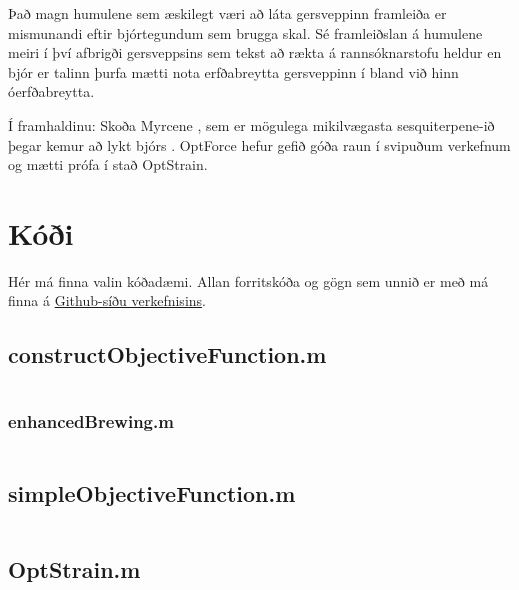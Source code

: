 \documentclass[11pt]{article}
\newcommand{\matlab}[1]{\inputminted[linenos, frame=lines, label=#1, fontsize=\small]{matlab}{#1}}
\begin{document}
\begin{multicols}{2}
Það magn humulene sem æskilegt væri að láta gersveppinn framleiða er mismunandi eftir bjórtegundum sem brugga skal. Sé framleiðslan á humulene meiri í því afbrigði gersveppsins sem tekst að rækta á rannsóknarstofu heldur en bjór er talinn þurfa mætti nota erfðabreytta gersveppinn í bland við hinn óerfðabreytta.

Í framhaldinu: Skoða Myrcene \cite[KEGG: C06074]{Kanehisa01012000}, sem er mögulega mikilvægasta sesquiterpene-ið þegar kemur að lykt bjórs \cite{guadagni1966odour}. OptForce\cite{ranganathan2010optforce} hefur gefið góða raun í svipuðum verkefnum og mætti prófa í stað OptStrain.




\end{multicols}


\clearpage
\appendix
\section{Kóði}
Hér má finna valin kóðadæmi. Allan forritskóða og gögn sem unnið er með má finna á \href{https://github.com/Ernir/optstrain}{Github-síðu verkefnisins}.

\subsection{constructObjectiveFunction.m}
\label{code:constructObjectiveFunction}
\matlab{../constructObjectiveFunction.m}

\subsubsection{enhancedBrewing.m}
\label{code:enhancedBrewing}
\matlab{../enhancedBrewing.m}

\subsection{simpleObjectiveFunction.m}
\label{code:simpleObjectiveFunction}
\matlab{../simpleObjectiveFunction.m}

\subsection{OptStrain.m}
\label{code:OptStrain}
\matlab{../OptStrain.m}
\end{document}
